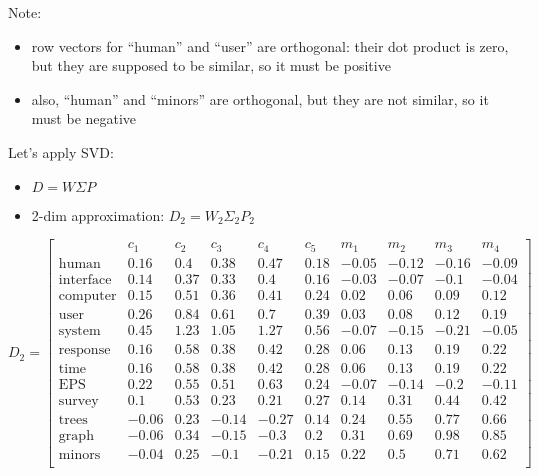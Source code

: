 Note:

\begin{itemize}
\itemsep1pt\parskip0pt
\item
  row vectors for ``human'' and ``user'' are orthogonal: their dot
  product is zero, but they are supposed to be similar, so it must be
  positive
\item
  also, ``human'' and ``minors'' are orthogonal, but they are not
  similar, so it must be negative
\end{itemize}

Let's apply SVD:

\begin{itemize}
\itemsep1pt\parskip0pt
\item
  $D = W \Sigma P$
\item
  2-dim approximation: $D_2 = W_2 \Sigma_2 P_2$
\end{itemize}

$$D_2 =
\left[\begin{array}{c|ccccccccc}
 & c_1 & c_2 & c_3 & c_4 & c_5 & m_1 & m_2 & m_3 & m_4 \\
\hline
\text{human} & 0.16 & 0.4 & 0.38 & 0.47 & 0.18 & -0.05 & -0.12 & -0.16 & -0.09 \\
\text{interface} & 0.14 & 0.37 & 0.33 & 0.4 & 0.16 & -0.03 & -0.07 & -0.1 & -0.04 \\
\text{computer} & 0.15 & 0.51 & 0.36 & 0.41 & 0.24 & 0.02 & 0.06 & 0.09 & 0.12 \\
\text{user} & 0.26 & 0.84 & 0.61 & 0.7 & 0.39 & 0.03 & 0.08 & 0.12 & 0.19 \\
\text{system} & 0.45 & 1.23 & 1.05 & 1.27 & 0.56 & -0.07 & -0.15 & -0.21 & -0.05 \\
\text{response} & 0.16 & 0.58 & 0.38 & 0.42 & 0.28 & 0.06 & 0.13 & 0.19 & 0.22 \\
\text{time} & 0.16 & 0.58 & 0.38 & 0.42 & 0.28 & 0.06 & 0.13 & 0.19 & 0.22 \\
\text{EPS} & 0.22 & 0.55 & 0.51 & 0.63 & 0.24 & -0.07 & -0.14 & -0.2 & -0.11 \\
\text{survey} & 0.1 & 0.53 & 0.23 & 0.21 & 0.27 & 0.14 & 0.31 & 0.44 & 0.42 \\
\text{trees} &-0.06 & 0.23 & -0.14 & -0.27 & 0.14 & 0.24 & 0.55 & 0.77 & 0.66 \\
\text{graph} &-0.06 & 0.34 & -0.15 & -0.3 & 0.2 & 0.31 & 0.69 & 0.98 & 0.85 \\
\text{minors} &-0.04 & 0.25 & -0.1 & -0.21 & 0.15 & 0.22 & 0.5 & 0.71 & 0.62 \\
\end{array}\right]$$


